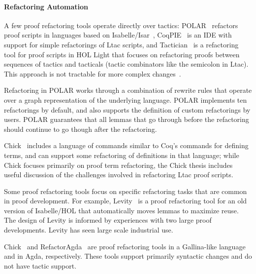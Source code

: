 
\paragraph{Refactoring Automation}

A few proof refactoring tools operate directly over tactics:
POLAR~\cite{Dietrich2013} refactors proof scripts in languages based on Isabelle/Isar~\cite{Wenzel2007isar},
CoqPIE~\cite{Roe2016} is an IDE with support for simple refactorings of Ltac scripts, and
Tactician~\cite{adams2015} is a refactoring tool for proof scripts in HOL Light
that focuses on refactoring proofs between sequences of tactics and tacticals (tactic combinators like
the semicolon in Ltac).
This approach is not tractable for more complex changes~\cite{robert2018}.

Refactoring in \textsc{POLAR} works through a combination of rewrite rules that operate over
a graph representation of the underlying language. %
\textsc{POLAR} implements ten refactorings by default,
and also supports the definition of custom refactorings by users. 
\textsc{POLAR} guarantees that all lemmas that go through before
the refactoring should continue to go though after the refactoring.

Chick~\cite{robert2018front} includes a language of commands similar to Coq's commands for defining terms,
and can support some refactoring of definitions in that language;
while Chick focuses primarily on proof term refactoring, the Chick thesis
includes useful discussion of the challenges involved in refactoring Ltac proof scripts.

Some proof refactoring tools focus on specific refactoring tasks that are common in proof development.
For example, Levity~\cite{Bourke12} is a proof refactoring tool for an old version of Isabelle/HOL that automatically
moves lemmas %
to maximize reuse. The design of Levity is informed by
experiences with two large proof developments.
Levity has seen large scale industrial use.

Chick~\cite{robert2018} and RefactorAgda~\cite{wibergh2019} are proof refactoring tools
in a Gallina-like language and in Agda, respectively.
These tools support primarily syntactic changes and do not have tactic support.

